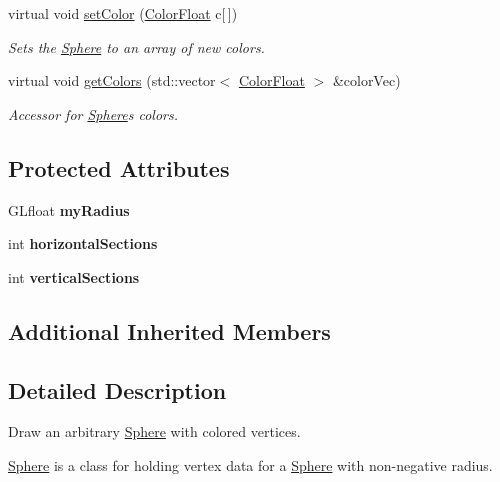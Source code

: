 \begin{DoxyCompactItemize}
virtual void \hyperlink{classtsgl_1_1_sphere_aab902ab87c24e7065c74f553f7e8c126}{set\+Color} (\hyperlink{structtsgl_1_1_color_float}{Color\+Float} c\mbox{[}$\,$\mbox{]})
\begin{DoxyCompactList}\small\item\em Sets the \hyperlink{classtsgl_1_1_sphere}{Sphere} to an array of new colors. \end{DoxyCompactList}\item 
virtual void \hyperlink{classtsgl_1_1_sphere_a767bfb1b0c6c29d0577377aa0403d881}{get\+Colors} (std\+::vector$<$ \hyperlink{structtsgl_1_1_color_float}{Color\+Float} $>$ \&color\+Vec)
\begin{DoxyCompactList}\small\item\em Accessor for \hyperlink{classtsgl_1_1_sphere}{Sphere}\textquotesingle{}s colors. \end{DoxyCompactList}\end{DoxyCompactItemize}
\subsection*{Protected Attributes}
\begin{DoxyCompactItemize}
\item 
\mbox{\label{classtsgl_1_1_sphere_ab4d6cee5f4c8ce474b58f3d528d5ef64}} 
G\+Lfloat {\bfseries my\+Radius}
\item 
\mbox{\label{classtsgl_1_1_sphere_a00159df8b6b14b13423a5654312bd0b6}} 
int {\bfseries horizontal\+Sections}
\item 
\mbox{\label{classtsgl_1_1_sphere_abed42db5d3fa69211ba25fb03ba6d23f}} 
int {\bfseries vertical\+Sections}
\end{DoxyCompactItemize}
\subsection*{Additional Inherited Members}


\subsection{Detailed Description}
Draw an arbitrary \hyperlink{classtsgl_1_1_sphere}{Sphere} with colored vertices. 

\hyperlink{classtsgl_1_1_sphere}{Sphere} is a class for holding vertex data for a \hyperlink{classtsgl_1_1_sphere}{Sphere} with non-\/negative radius. 

